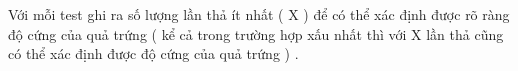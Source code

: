 Với mỗi test ghi ra số lượng lần thả ít nhất ( X ) để có thể xác định được rõ ràng độ cứng của quả trứng ( kể cả trong trường hợp xấu nhất thì với X lần thả cũng có thể xác định được độ cứng của quả trứng ) .  

\